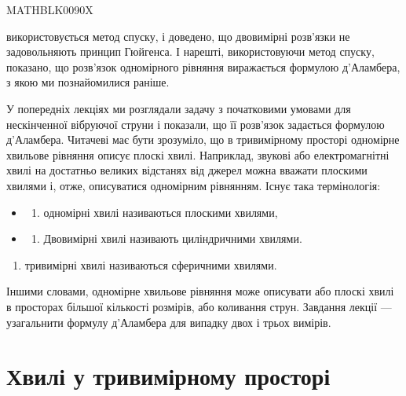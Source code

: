 \documentclass[
  ukrainian,
]{article}
\providecommand{\tightlist}{%
  \setlength{\itemsep}{0pt}\setlength{\parskip}{0pt}}
\begin{document}
MATHBLK0090X

використовується метод спуску, і доведено, що двовимірні розв'язки не
задовольняють принцип Гюйгенса. І нарешті, використовуючи метод спуску,
показано, що розв'язок одномірного рівняння виражається формулою
д'Аламбера, з якою ми познайомилися раніше.

У попередніх лекціях ми розглядали задачу з початковими умовами для
нескінченної вібруючої струни і показали, що її розв'язок задається
формулою д'Аламбера. Читачеві має бути зрозуміло, що в тривимірному
просторі одномірне хвильове рівняння описує плоскі хвилі. Наприклад,
звукові або електромагнітні хвилі на достатньо великих відстанях від
джерел можна вважати плоскими хвилями і, отже, описуватися одномірним
рівнянням. Існує така термінологія:

\begin{itemize}
\tightlist
\item
  \begin{enumerate}
  \def\labelenumi{\arabic{enumi})}
  \tightlist
  \item
    одномірні хвилі називаються плоскими хвилями,
  \end{enumerate}
\item
  \begin{enumerate}
  \def\labelenumi{\arabic{enumi})}
  \setcounter{enumi}{1}
  \tightlist
  \item
    Двовимірні хвилі називають циліндричними хвилями.
  \end{enumerate}
\end{itemize}

\begin{enumerate}
\def\labelenumi{\arabic{enumi})}
\setcounter{enumi}{2}
\tightlist
\item
  тривимірні хвилі називаються сферичними хвилями.
\end{enumerate}

Іншими словами, одномірне хвильове рівняння може описувати або плоскі
хвилі в просторах більшої кількості розмірів, або коливання струн.
Завдання лекції --- узагальнити формулу д'Аламбера для випадку двох і
трьох вимірів.

\section{Хвилі у тривимірному
просторі}\label{ux445ux432ux438ux43bux456-ux443-ux442ux440ux438ux432ux438ux43cux456ux440ux43dux43eux43cux443-ux43fux440ux43eux441ux442ux43eux440ux456}
\end{document}
